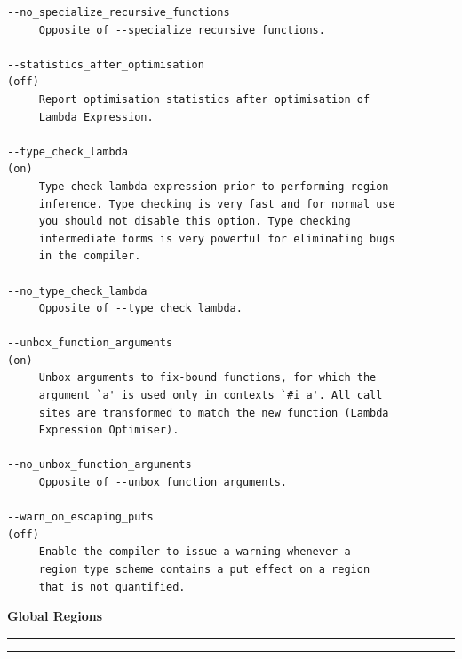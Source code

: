 \documentclass[12pt]{book}
\begin{document}
{\begin{verbatim}
--no_specialize_recursive_functions
     Opposite of --specialize_recursive_functions.

--statistics_after_optimisation                                     (off)
     Report optimisation statistics after optimisation of
     Lambda Expression.

--type_check_lambda                                                  (on)
     Type check lambda expression prior to performing region
     inference. Type checking is very fast and for normal use
     you should not disable this option. Type checking
     intermediate forms is very powerful for eliminating bugs
     in the compiler.

--no_type_check_lambda
     Opposite of --type_check_lambda.

--unbox_function_arguments                                           (on)
     Unbox arguments to fix-bound functions, for which the
     argument `a' is used only in contexts `#i a'. All call 
     sites are transformed to match the new function (Lambda
     Expression Optimiser).

--no_unbox_function_arguments
     Opposite of --unbox_function_arguments.

--warn_on_escaping_puts                                             (off)
     Enable the compiler to issue a warning whenever a 
     region type scheme contains a put effect on a region
     that is not quantified.
\end{verbatim}
}
\newpage
{}
\printindex

\newpage
\begin{center}
\bf Global Regions
\end{center}
\smallskip

\hrule
{}
\hrule
\bigskip
\end{document}
